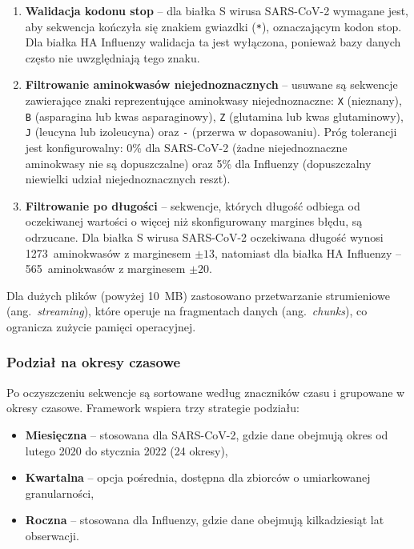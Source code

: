 \begin{enumerate}
    \item \textbf{Walidacja kodonu stop} -- dla białka S wirusa SARS-CoV-2 wymagane jest, aby sekwencja kończyła się znakiem gwiazdki (\texttt{*}), oznaczającym kodon stop. Dla białka HA Influenzy walidacja ta jest wyłączona, ponieważ bazy danych często nie uwzględniają tego znaku.

    \item \textbf{Filtrowanie aminokwasów niejednoznacznych} -- usuwane są sekwencje zawierające znaki reprezentujące aminokwasy niejednoznaczne: \texttt{X} (nieznany), \texttt{B} (asparagina lub kwas asparaginowy), \texttt{Z} (glutamina lub kwas glutaminowy), \texttt{J} (leucyna lub izoleucyna) oraz \texttt{-} (przerwa w dopasowaniu). Próg tolerancji jest konfigurowalny: 0\% dla SARS-CoV-2 (żadne niejednoznaczne aminokwasy nie są dopuszczalne) oraz 5\% dla Influenzy (dopuszczalny niewielki udział niejednoznacznych reszt).

    \item \textbf{Filtrowanie po długości} -- sekwencje, których długość odbiega od oczekiwanej wartości o więcej niż skonfigurowany margines błędu, są odrzucane. Dla białka S wirusa SARS-CoV-2 oczekiwana długość wynosi 1273~aminokwasów z marginesem $\pm 13$, natomiast dla białka HA Influenzy -- 565~aminokwasów z marginesem $\pm 20$.
\end{enumerate}

Dla dużych plików (powyżej 10~MB) zastosowano przetwarzanie strumieniowe (ang.~\emph{streaming}), które operuje na fragmentach danych (ang.~\emph{chunks}), co ogranicza zużycie pamięci operacyjnej.

\subsubsection{Podział na okresy czasowe}
\label{subsubsec:okresy}

Po oczyszczeniu sekwencje są sortowane według znaczników czasu i grupowane w okresy czasowe. Framework wspiera trzy strategie podziału:

\begin{itemize}
    \item \textbf{Miesięczna} -- stosowana dla SARS-CoV-2, gdzie dane obejmują okres od lutego 2020 do stycznia 2022 (24 okresy),
    \item \textbf{Kwartalna} -- opcja pośrednia, dostępna dla zbiorców o umiarkowanej granularności,
    \item \textbf{Roczna} -- stosowana dla Influenzy, gdzie dane obejmują kilkadziesiąt lat obserwacji.
\end{itemize}

